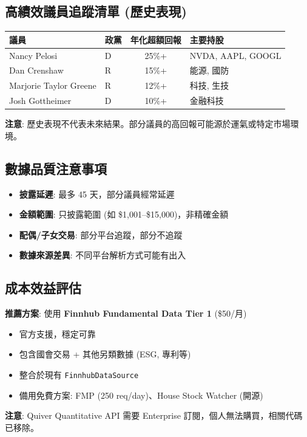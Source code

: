 \documentclass[11pt,a4paper]{article}
\begin{document}
\subsection*{高績效議員追蹤清單 (歷史表現)}

\begin{table}[H]
\centering
\small
\begin{tabular}{@{}llcl@{}}
\toprule
\textbf{議員} & \textbf{政黨} & \textbf{年化超額回報} & \textbf{主要持股} \\
\midrule
Nancy Pelosi & D & 25\%+ & NVDA, AAPL, GOOGL \\
Dan Crenshaw & R & 15\%+ & 能源, 國防 \\
Marjorie Taylor Greene & R & 12\%+ & 科技, 生技 \\
Josh Gottheimer & D & 10\%+ & 金融科技 \\
\bottomrule
\end{tabular}
\end{table}

\textbf{注意}: 歷史表現不代表未來結果。部分議員的高回報可能源於運氣或特定市場環境。

\subsection*{數據品質注意事項}

\begin{itemize}
    \item \textbf{披露延遲}: 最多 45 天，部分議員經常延遲
    \item \textbf{金額範圍}: 只披露範圍 (如 \$1,001--\$15,000)，非精確金額
    \item \textbf{配偶/子女交易}: 部分平台追蹤，部分不追蹤
    \item \textbf{數據來源差異}: 不同平台解析方式可能有出入
\end{itemize}

\subsection*{成本效益評估}

\begin{tcolorbox}[colback=ibkrblue!5,colframe=ibkrblue]
\textbf{推薦方案}: 使用 \textbf{Finnhub Fundamental Data Tier 1} (\$50/月)

\begin{itemize}[leftmargin=*]
    \item 官方支援，穩定可靠
    \item 包含國會交易 + 其他另類數據 (ESG, 專利等)
    \item 整合於現有 \texttt{FinnhubDataSource}
    \item 備用免費方案: FMP (250 req/day)、House Stock Watcher (開源)
\end{itemize}

\textbf{注意}: Quiver Quantitative API 需要 Enterprise 訂閱，個人無法購買，相關代碼已移除。
\end{tcolorbox}
\end{document}
